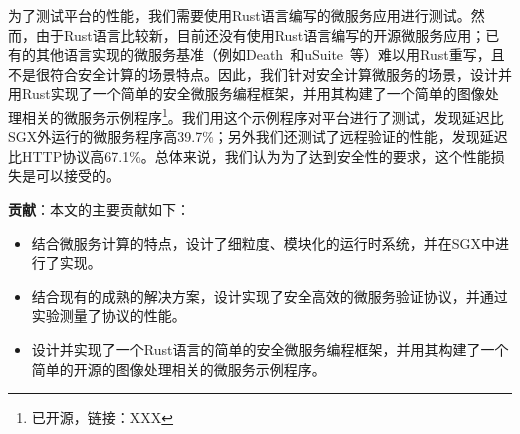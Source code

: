 为了测试平台的性能，我们需要使用Rust语言编写的微服务应用进行测试。然而，由于Rust语言比较新，目前还没有使用Rust语言编写的开源微服务应用；已有的其他语言实现的微服务基准（例如Death~\cite{}和uSuite~\cite{}等）难以用Rust重写，且不是很符合安全计算的场景特点。因此，我们针对安全计算微服务的场景，设计并用Rust实现了一个简单的安全微服务编程框架，并用其构建了一个简单的图像处理相关的微服务示例程序\footnote{已开源，链接：XXX}。我们用这个示例程序对平台进行了测试，发现延迟比SGX外运行的微服务程序高39.7\%；另外我们还测试了远程验证的性能，发现延迟比HTTP协议高67.1\%。总体来说，我们认为为了达到安全性的要求，这个性能损失是可以接受的。


\textbf{贡献}：本文的主要贡献如下：
\begin{itemize}
    \item 结合微服务计算的特点，设计了细粒度、模块化的运行时系统，并在SGX中进行了实现。
    \item 结合现有的成熟的解决方案，设计实现了安全高效的微服务验证协议，并通过实验测量了协议的性能。
    \item 设计并实现了一个Rust语言的简单的安全微服务编程框架，并用其构建了一个简单的开源的图像处理相关的微服务示例程序。
\end{itemize}




